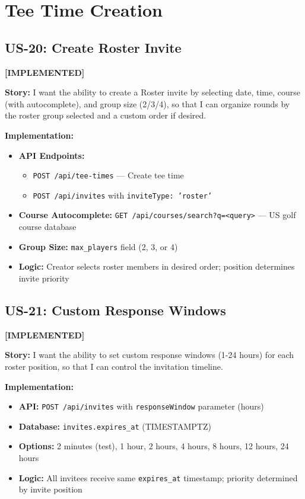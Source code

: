 \documentclass[11pt,a4paper]{article}
\newcommand{\implemented}{\textcolor{implemented}{\textbf{[IMPLEMENTED]}}}
\begin{document}
\section{Tee Time Creation}

\subsection{US-20: Create Roster Invite}
\implemented

\textbf{Story:} I want the ability to create a Roster invite by selecting date, time, course (with autocomplete), and group size (2/3/4), so that I can organize rounds by the roster group selected and a custom order if desired.

\textbf{Implementation:}
\begin{itemize}[leftmargin=*]
  \item \textbf{API Endpoints:}
    \begin{itemize}
      \item \texttt{POST /api/tee-times} --- Create tee time
      \item \texttt{POST /api/invites} with \texttt{inviteType: 'roster'}
    \end{itemize}
  \item \textbf{Course Autocomplete:} \texttt{GET /api/courses/search?q=<query>} --- US golf course database
  \item \textbf{Group Size:} \texttt{max\_players} field (2, 3, or 4)
  \item \textbf{Logic:} Creator selects roster members in desired order; position determines invite priority
\end{itemize}

\subsection{US-21: Custom Response Windows}
\implemented

\textbf{Story:} I want the ability to set custom response windows (1-24 hours) for each roster position, so that I can control the invitation timeline.

\textbf{Implementation:}
\begin{itemize}[leftmargin=*]
  \item \textbf{API:} \texttt{POST /api/invites} with \texttt{responseWindow} parameter (hours)
  \item \textbf{Database:} \texttt{invites.expires\_at} (TIMESTAMPTZ)
  \item \textbf{Options:} 2 minutes (test), 1 hour, 2 hours, 4 hours, 8 hours, 12 hours, 24 hours
  \item \textbf{Logic:} All invitees receive same \texttt{expires\_at} timestamp; priority determined by invite position
\end{itemize}
\end{document}
